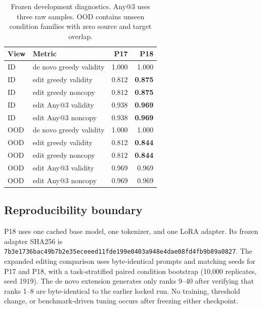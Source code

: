 \begin{table}[h]
  \centering
  \caption{Frozen development diagnostics. Any@3 uses three raw samples.
  OOD contains unseen condition families with zero source and target overlap.}
  \label{tab:frozen-validation}
  \small
  \setlength{\tabcolsep}{4pt}
  \begin{tabular}{llrr}
    \toprule
    View & Metric & P17 & P18 \\
    \midrule
    ID & de novo greedy validity & 1.000 & 1.000 \\
    ID & edit greedy validity & 0.812 & \textbf{0.875} \\
    ID & edit greedy noncopy & 0.812 & \textbf{0.875} \\
    ID & edit Any@3 validity & 0.938 & \textbf{0.969} \\
    ID & edit Any@3 noncopy & 0.938 & \textbf{0.969} \\
    \midrule
    OOD & de novo greedy validity & 1.000 & 1.000 \\
    OOD & edit greedy validity & 0.812 & \textbf{0.844} \\
    OOD & edit greedy noncopy & 0.812 & \textbf{0.844} \\
    OOD & edit Any@3 validity & 0.969 & 0.969 \\
    OOD & edit Any@3 noncopy & 0.969 & 0.969 \\
    \bottomrule
  \end{tabular}
\end{table}

\subsection{Reproducibility boundary}
\label{sec:appendix-reproducibility}

P18 uses one cached base model, one tokenizer, and one LoRA adapter. Its frozen
adapter SHA256 is
\texttt{7b3e1736bac49b7b2e35eceeed11fde199e0403a948e4dae08fd4fb9b89a0827}.
The expanded editing comparison uses byte-identical prompts and matching seeds
for P17 and P18, with a task-stratified paired condition bootstrap (10,000
replicates, seed 1919). The de novo extension generates only ranks 9--40 after
verifying that ranks 1--8 are byte-identical to the earlier locked run. No
training, threshold change, or benchmark-driven tuning occurs after freezing
either checkpoint.
